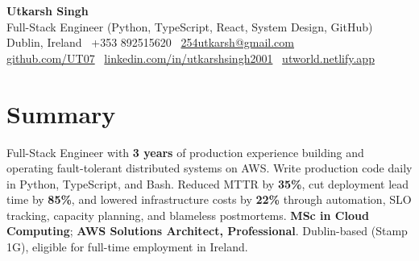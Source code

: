 \documentclass[10pt,a4paper]{article}
\begin{document}
\begin{center}
{\Large \textbf{Utkarsh Singh}}\\[0.04em]
{\normalsize Full-Stack Engineer (Python, TypeScript, React, System Design, GitHub)}\\[0.08em]
Dublin, Ireland \textbar\ +353 892515620 \textbar\ \href{mailto:254utkarsh@gmail.com}{254utkarsh@gmail.com}\\[0.08em]
\href{https://github.com/UT07}{github.com/UT07} \textbar\
\href{https://www.linkedin.com/in/utkarshsingh2001/}{linkedin.com/in/utkarshsingh2001} \textbar\
\href{https://utworld.netlify.app}{utworld.netlify.app}
\end{center}
\vspace{0.06em}

\section*{Summary}
Full-Stack Engineer with \textbf{3 years} of production experience building and operating fault-tolerant distributed systems on AWS. Write production code daily in Python, TypeScript, and Bash. Reduced MTTR by \textbf{35\%}, cut deployment lead time by \textbf{85\%}, and lowered infrastructure costs by \textbf{22\%} through automation, SLO tracking, capacity planning, and blameless postmortems. \textbf{MSc in Cloud Computing}; \textbf{AWS Solutions Architect, Professional}. Dublin-based (Stamp 1G), eligible for full-time employment in Ireland.

\end{document}
